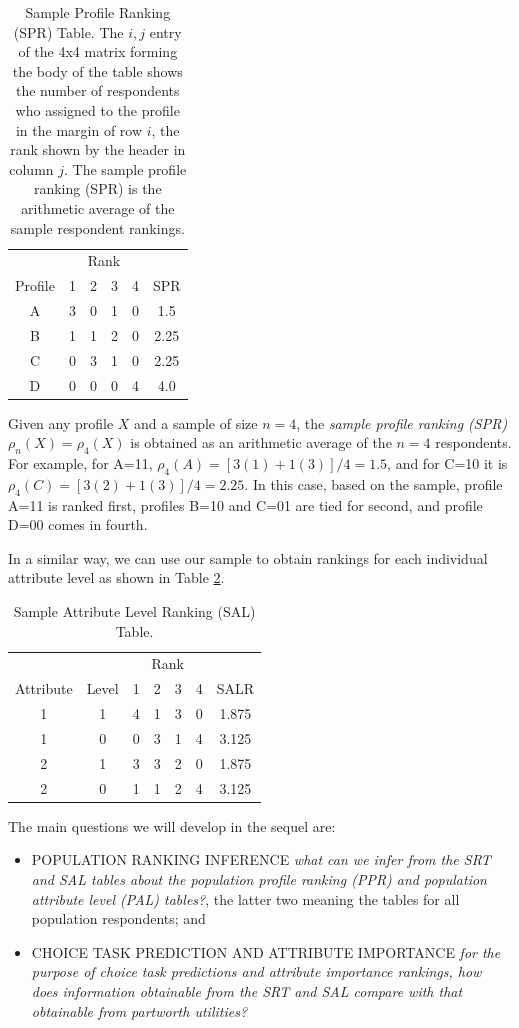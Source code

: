 \documentclass[a4paper, 12pt]{article}
\begin{document}
\begin{table}[!htpb]
\scriptsize
\centering
\begin{tabular}{c|cccc|c}
&\multicolumn{4}{c}{Rank}&\\
Profile& 1 & 2 & 3&4&SPR\\\hline
A& 3&0&1&0&1.5\\
B& 1 &1&2&0 &2.25\\
C& 0 &3&1&0&2.25 \\
D& 0 &0&0&4&4.0 \\
\end{tabular}
\caption{Sample Profile Ranking (SPR) Table. The $i,j$ entry of the 4x4 matrix forming the body of the table shows the number of respondents who assigned to  the profile in the margin of row $i$, the rank shown by the header in column $j$. The sample profile ranking (SPR) is the arithmetic average of the sample respondent rankings.}
\label{SPR}
\end{table}

Given any profile $X$ and a sample of size $n=4$, the \emph{sample profile ranking (SPR)} $\rho_n(X)=\rho_4(X)$ is obtained as an arithmetic average of the $n=4$ respondents.  For example, for A=11, $\rho_4(A)=[3(1)+1(3)]/4=1.5$, and for C=10 it is $\rho_4(C) = [3(2)+1(3)]/4=2.25$.
In this case, based on the sample, profile A=11 is ranked first, profiles B=10 and C=01 are tied for second, and profile D=00 comes in fourth.

In a similar way, we can use our sample to obtain rankings for each individual attribute level as shown in Table \ref{SAL}.

\begin{table}[!htpb]
	\scriptsize
	\centering
	\begin{tabular}{cc|cccc|c}
		&&\multicolumn{4}{c}{Rank}&\\
		Attribute& Level& 1 & 2 & 3&4&SALR\\\hline
		1& 1 & 4&1&3&0&1.875\\
		1& 0 & 0 &3&1&4 &3.125\\
		2& 1& 3 &3&2&0&1.875 \\
		2& 0 & 1 &1&2&4&3.125 \\
	\end{tabular}
	\caption{Sample Attribute Level Ranking (SAL) Table. }
	\label{SAL}
\end{table}

The main questions we will develop in the sequel are: 
\begin{itemize}
\item POPULATION RANKING INFERENCE \emph{what can we infer from the SRT and SAL tables about the population profile ranking  (PPR) and population attribute level (PAL) tables?}, the latter two meaning the tables for all population respondents; and
\item CHOICE TASK PREDICTION AND ATTRIBUTE IMPORTANCE \emph{for the purpose of choice task predictions and attribute importance rankings, how does information obtainable from the SRT and SAL compare with that obtainable from partworth utilities?}
\end{itemize}
\end{document}
